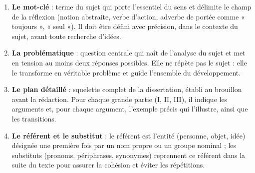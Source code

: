 \documentclass[11pt]{article}
\newcommand{\cle}[1]{{\popxbold\color{popdark}#1}}
\begin{document}
\begin{corrige}
\begin{enumerate}
\item \textbf{Le \cle{mot-clé}} : terme du sujet qui porte l'essentiel du sens et délimite le champ de la réflexion (notion abstraite, verbe d'action, adverbe de portée comme « toujours », « seul »). Il doit être défini avec précision, dans le contexte du sujet, avant toute recherche d'idées.
\item \textbf{La \cle{problématique}} : question centrale qui naît de l'analyse du sujet et met en tension au moins deux réponses possibles. Elle ne répète pas le sujet : elle le transforme en véritable problème et guide l'ensemble du développement.
\item \textbf{Le \cle{plan détaillé}} : squelette complet de la dissertation, établi au brouillon avant la rédaction. Pour chaque grande partie (I, II, III), il indique les arguments et, pour chaque argument, l'exemple précis qui l'illustre, ainsi que les transitions.
\item \textbf{Le \cle{référent} et le \cle{substitut}} : le référent est l'entité (personne, objet, idée) désignée une première fois par un nom propre ou un groupe nominal ; les substituts (pronoms, périphrases, synonymes) reprennent ce référent dans la suite du texte pour assurer la \cle{cohésion} et éviter les répétitions.
\end{enumerate}
\end{corrige}
\end{document}
